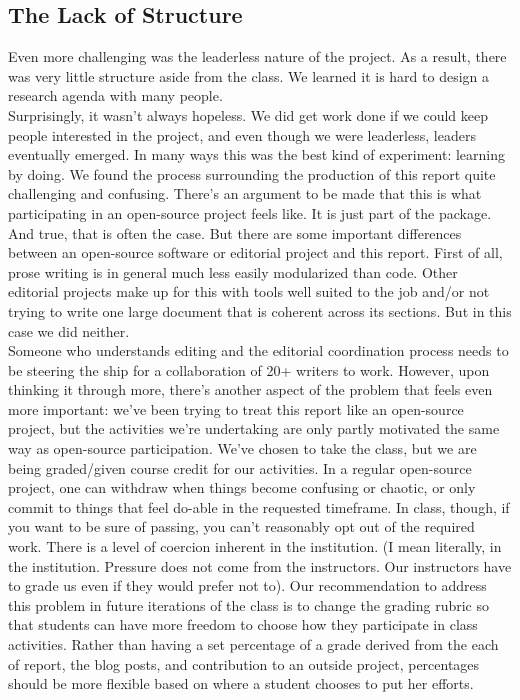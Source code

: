 \subsection{The Lack of Structure}
Even more challenging was the leaderless nature of the project. As a result, there was very little structure aside from the class. We learned it is hard to design a research agenda with many people. \\
\noindent Surprisingly, it wasn't always hopeless. We did get work done if we could keep people interested in the project, and even though we were leaderless, leaders eventually emerged. In many ways this was the best kind of experiment: learning by doing.  
We found the process surrounding the production of this report quite challenging and confusing. There's an argument to be made that this is what participating in an open-source project feels like. It is just part of the package. And true, that is often the case. But there are some important differences between an open-source software or editorial project and this report. First of all, prose writing is in general much less easily modularized than code. Other editorial projects make up for this with tools well suited to the job and/or not trying to write one large document that is coherent across its sections. But in this case we did neither. \\
\noindent Someone who understands editing and the editorial coordination process needs to be steering the ship for a collaboration of 20+ writers to work. However, upon thinking it through more, there's another aspect of the problem that feels even more important: we've been trying to treat this report like an open-source project, but the activities we're undertaking are only partly motivated the same way as open-source participation. We've chosen to take the class, but we are being graded/given course credit for our activities. In a regular open-source project, one can withdraw when things become confusing or chaotic, or only commit to things that feel do-able in the requested timeframe. 
In class, though, if you want to be sure of passing, you can't reasonably opt out of the required work. There is a level of coercion inherent in the institution. (I mean literally, in the institution. Pressure does not come from the instructors. Our instructors have to grade us even if they would prefer not to). Our recommendation to address this problem in future iterations of the class is to change the grading rubric so that students can have more freedom to choose how they participate in class activities. Rather than having a set percentage of a grade derived from the each of report, the blog posts, and contribution to an outside project, percentages should be more flexible based on where a student chooses to put her efforts. \\

